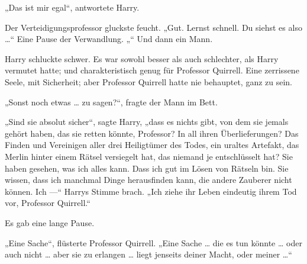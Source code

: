 „Das ist mir egal“, antwortete Harry.

Der Verteidigungsprofessor gluckste feucht.
„Gut. Lernst schnell. Du siehst es also …“ Eine Pause der Verwandlung. „“ Und dann ein Mann.

Harry schluckte schwer. Es war sowohl besser als auch schlechter, als Harry vermutet hatte; und charakteristisch genug für Professor Quirrell. Eine zerrissene Seele, mit Sicherheit; aber Professor Quirrell hatte nie behauptet, ganz zu sein.

„Sonst noch etwas … zu sagen?“, fragte der Mann im Bett.

„Sind sie absolut sicher“, sagte Harry, „dass es nichts gibt, von dem sie jemals gehört haben, das sie retten könnte, Professor? In all ihren Überlieferungen? Das Finden und Vereinigen aller drei Heiligtümer des Todes, ein uraltes Artefakt, das Merlin hinter einem Rätsel versiegelt hat, das niemand je entschlüsselt hat? Sie haben gesehen, was ich alles kann. Dass ich gut im Lösen von Rätseln bin. Sie wissen, dass ich manchmal Dinge herausfinden kann, die andere Zauberer nicht können. Ich —“
Harrys Stimme brach.
„Ich ziehe ihr Leben eindeutig ihrem Tod vor, Professor Quirrell.“

Es gab eine lange Pause.

„Eine Sache“, flüsterte Professor Quirrell.
„Eine Sache … die es tun könnte … oder auch nicht … aber sie zu erlangen … liegt jenseits deiner Macht, oder meiner …“

